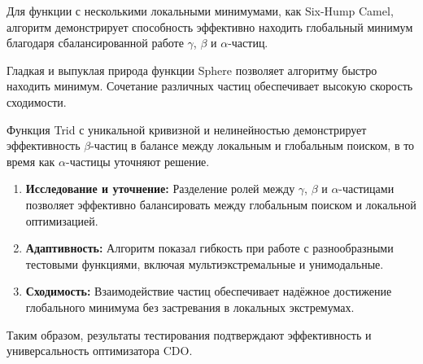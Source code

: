 \documentclass[10pt]{article}
\begin{document}
Для функции с несколькими локальными минимумами, как Six-Hump Camel, алгоритм демонстрирует способность эффективно находить глобальный минимум благодаря сбалансированной работе $\gamma$, $\beta$ и $\alpha$-частиц.

Гладкая и выпуклая природа функции Sphere позволяет алгоритму быстро находить минимум. Сочетание различных частиц обеспечивает высокую скорость сходимости.

Функция Trid с уникальной кривизной и нелинейностью демонстрирует эффективность $\beta$-частиц в балансе между локальным и глобальным поиском, в то время как $\alpha$-частицы уточняют решение.

\begin{enumerate}
    \item \textbf{Исследование и уточнение:} Разделение ролей между $\gamma$, $\beta$ и $\alpha$-частицами позволяет эффективно балансировать между глобальным поиском и локальной оптимизацией.
    \item \textbf{Адаптивность:} Алгоритм показал гибкость при работе с разнообразными тестовыми функциями, включая мультиэкстремальные и унимодальные.
    \item \textbf{Сходимость:} Взаимодействие частиц обеспечивает надёжное достижение глобального минимума без застревания в локальных экстремумах.
\end{enumerate}

Таким образом, результаты тестирования подтверждают эффективность и универсальность оптимизатора CDO.
\end{document}
